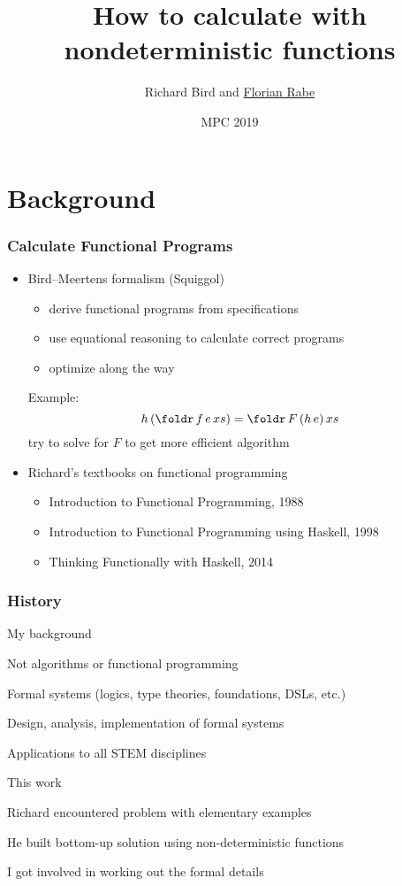 \documentclass{beamer}
\begin{document}
\title{How to calculate with nondeterministic functions}
\author{Richard Bird and \underline{Florian Rabe}}
\date{MPC 2019}
\begin{frame}
    \titlepage
\end{frame}

\section{Background}

\begin{frame}\frametitle{Calculate Functional Programs}
\begin{itemize}
\item Bird–Meertens formalism (Squiggol)
 \begin{itemize}
 \item derive functional programs from specifications
 \item use equational reasoning to calculate correct programs
 \item optimize along the way
 \end{itemize}
 Example: \[h\,(\foldr\,f\,e\,xs) = \foldr\,F\,(h\,e)\, xs\]
 try to solve for $F$ to get more efficient algorithm
\item Richard's textbooks on functional programming
 \begin{itemize}
 \item Introduction to Functional Programming, 1988
 \item Introduction to Functional Programming using Haskell, 1998
 \item Thinking Functionally with Haskell, 2014
 \end{itemize} 
\end{itemize}
\end{frame}

\begin{frame}\frametitle{History}
\begin{blockitems}{My background}
\item Not algorithms or functional programming
\item Formal systems (logics, type theories, foundations, DSLs, etc.)
\item Design, analysis, implementation of formal systems
\item Applications to all STEM disciplines
\end{blockitems}

\begin{blockitems}{This work}
\item Richard encountered problem with elementary examples
\item He built bottom-up solution using non-deterministic functions
\item I got involved in working out the formal details
\end{blockitems}
\end{frame}
\end{document}
